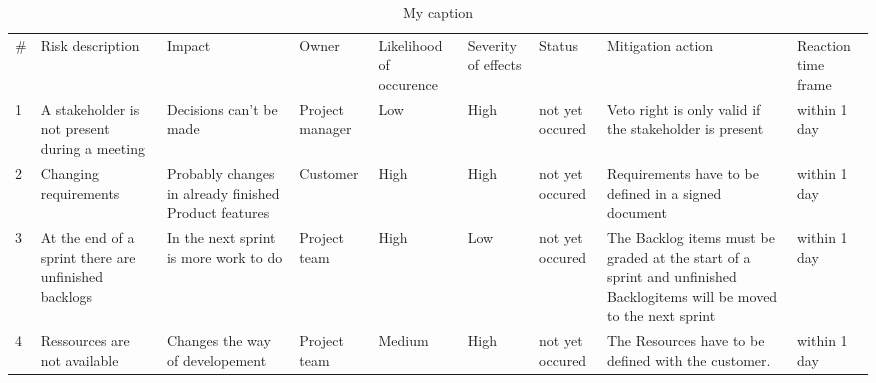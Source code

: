     \begin{table}[H]
        \centering
        \begin{tabular}{lllllllll}
            \# & Risk description                                     & Impact                                                & Owner           & Likelihood of occurence & Severity of effects & Status          & Mitigation action                                                                                                      & Reaction time frame \\
            1  & A stakeholder is not present during a meeting        & Decisions can't be made                               & Project manager & Low                     & High                & not yet occured & Veto right is only valid if the stakeholder is present                                                                 & within 1 day        \\
            2  & Changing requirements                                & Probably changes in already finished Product features & Customer        & High                    & High                & not yet occured & Requirements have to be defined in a signed document                                                                   & within 1 day        \\
            3  & At the end of a sprint there are unfinished backlogs & In the next sprint is more work to do                 & Project team    & High                    & Low                 & not yet occured & The Backlog items must be graded at the start of a sprint and unfinished Backlogitems will be moved to the next sprint & within 1 day        \\
            4  & Ressources are not available                         & Changes the way of developement                       & Project team    & Medium                  & High                & not yet occured & The Resources have to be defined with the customer.                                                                    & within 1 day       
        \end{tabular}
        \caption{My caption}
        \label{my-label}
    \end{table}